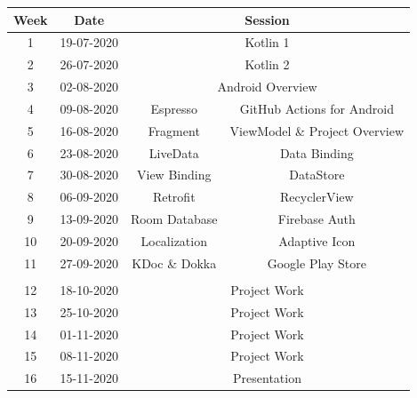 \documentclass{article}
\begin{document}
\renewcommand{\arraystretch}{1.5}
\begin{tabular}{|c|c|c|c|}
	\hline
	\textbf{Week} & \textbf{Date}     & \multicolumn{2}{c|}{\textbf{Session}}        \\ \hline
	\small 1      & \small 19-07-2020 & \multicolumn{2}{c|}{\small Kotlin 1} \\ \hline
	\small 2      & \small 26-07-2020 & \multicolumn{2}{c|}{\small Kotlin 2} \\ \hline
	\small 3      & \small 02-08-2020 & \multicolumn{2}{c|}{\small Android Overview} \\ \hline
	\small 4      & \small 09-08-2020 & \small Espresso & \small GitHub Actions for Android  \\ \hline
	\small 5      & \small 16-08-2020 & \small Fragment & \small ViewModel \& Project Overview  \\ \hline
	\small 6      & \small 23-08-2020 & \small LiveData & \small Data Binding  \\ \hline
	\small 7      & \small 30-08-2020 & \small View Binding & \small DataStore  \\ \hline
	\small 8      & \small 06-09-2020 & \small Retrofit & \small RecyclerView  \\ \hline
	\small 9      & \small 13-09-2020 & \small Room Database  & \small Firebase Auth  \\ \hline

	\small 10     & \small 20-09-2020 & \small Localization & \small Adaptive Icon   \\ \hline 
	\small 11     & \small 27-09-2020 & \small KDoc \& Dokka & \small Google Play Store  \\ \hline
	\rowcolor{yellow} \multicolumn{4}{|c|}{\small Mid Term Break}                    \\ \hline
	\small 12     & \small 18-10-2020 & \multicolumn{2}{c|}{\small Project Work}     \\ \hline
	\small 13     & \small 25-10-2020 & \multicolumn{2}{c|}{\small Project Work}     \\ \hline
	\small 14     & \small 01-11-2020 & \multicolumn{2}{c|}{\small Project Work}     \\ \hline
	\small 15     & \small 08-11-2020 & \multicolumn{2}{c|}{\small Project Work}     \\ \hline
	\small 16     & \small 15-11-2020 & \multicolumn{2}{c|}{\small Presentation}     \\ \hline
\end{tabular}
\end{document}
